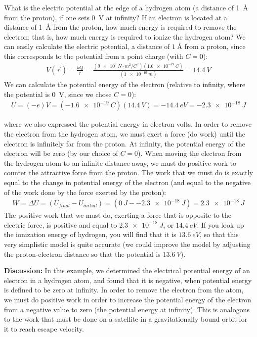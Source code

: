 \begin{example}{What is the electric potential at the edge of a hydrogen atom (a distance of \SI{1}{\angstrom} from the proton), if one sets \SI{0}{V} at infinity? If an electron is located at a distance of \SI{1}{\angstrom} from the proton, how much energy is required to remove the electron; that is, how much energy is required to ionize the hydrogen atom?}
We can easily calculate the electric potential, a distance of $\SI{1}{\angstrom}$ from a proton, since this corresponds to the potential from a point charge (with $C=0$):
\begin{align*}
V(\vec r)=\frac{kQ}{r}=\frac{(\SI{9e9}{N\cdot m^2/C^{2}})(\SI{1.6e-19}{C})}{(\SI{1e-10}{m})}=\SI{14.4}{V}
\end{align*}
We can calculate the potential energy of the electron (relative to infinity, where the potential is \SI{0}{V}, since we chose $C=0$):
\begin{align*}
U=(-e)V=(\SI{-1.6e-19}{C})(\SI{14.4}{V})=-\SI{14.4}{eV}=\SI{-2.3e-18}{J}
\end{align*}

where we also expressed the potential energy in electron volts. In order to remove the electron from the hydrogen atom, we must exert a force (do work) until the electron is infinitely far from the proton. At infinity, the potential energy of the electron will be zero (by our choice of $C=0$). When moving the electron from the hydrogen atom to an infinite distance away, we must do positive work to counter the attractive force from the proton. The work that we must do is exactly equal to the change in potential energy of the electron (and equal to the negative of the work done by the force exerted by the proton):
\begin{align*}
W=\Delta U=(U_{final}-U_{initial})=(\SI{0}{J}-\SI{-2.3e-18}{J})=\SI{2.3e-18}{J}
\end{align*}
The positive work that we must do, exerting a force that is opposite to the electric force, is positive and equal to $\SI{2.3e-18}{J}$, or $\SI{14.4}{eV}$. If you look up the ionization energy of hydrogen, you will find that it is $\SI{13.6}{eV}$, so that this very simplistic model is quite accurate (we could improve the model by adjusting the proton-electron distance so that the potential is $\SI{13.6}{V}$). 

\textbf{Discussion:} In this example, we determined the electrical potential energy of an electron in a hydrogen atom, and found that it is negative, when potential energy is defined to be zero at infinity. In order to remove the electron from the atom, we must do positive work in order to increase the potential energy of the electron from a negative value to zero (the potential energy at infinity). This is analogous to the work that must be done on a satellite in a gravitationally bound orbit for it to reach escape velocity.
\end{example}

